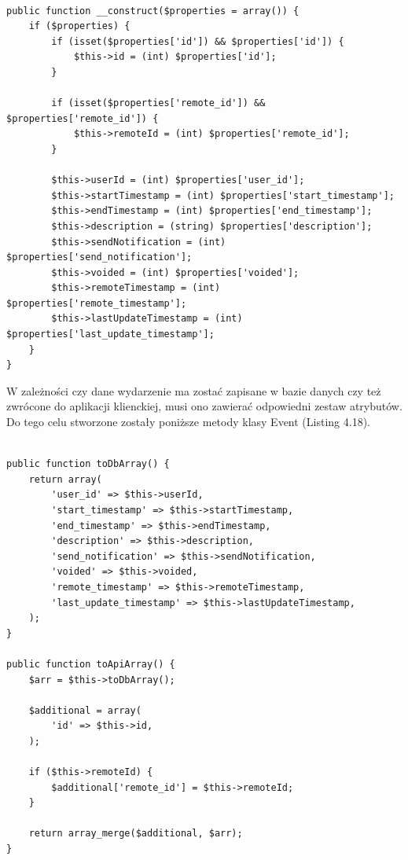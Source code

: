

\begin{lstlisting}[caption=Fragment konstruktora klasy Event., label=amb, captionpos=b]

public function __construct($properties = array()) {
    if ($properties) {
        if (isset($properties['id']) && $properties['id']) {
            $this->id = (int) $properties['id'];
        }

        if (isset($properties['remote_id']) && $properties['remote_id']) {
            $this->remoteId = (int) $properties['remote_id'];
        }

        $this->userId = (int) $properties['user_id'];
        $this->startTimestamp = (int) $properties['start_timestamp'];
        $this->endTimestamp = (int) $properties['end_timestamp'];
        $this->description = (string) $properties['description'];
        $this->sendNotification = (int) $properties['send_notification'];
        $this->voided = (int) $properties['voided'];
        $this->remoteTimestamp = (int) $properties['remote_timestamp'];
        $this->lastUpdateTimestamp = (int) $properties['last_update_timestamp'];
    }
}

\end{lstlisting}

W zależności czy dane wydarzenie ma zostać zapisane w bazie danych czy też zwrócone do aplikacji klienckiej, musi ono zawierać odpowiedni zestaw atrybutów. Do tego celu stworzone zostały poniższe metody klasy Event (Listing 4.18).

\begin{lstlisting}[caption=Serializacja obiektu Event., label=amb, captionpos=b]

public function toDbArray() {
    return array(
        'user_id' => $this->userId,
        'start_timestamp' => $this->startTimestamp,
        'end_timestamp' => $this->endTimestamp,
        'description' => $this->description,
        'send_notification' => $this->sendNotification,
        'voided' => $this->voided,
        'remote_timestamp' => $this->remoteTimestamp,
        'last_update_timestamp' => $this->lastUpdateTimestamp,
    );
}

public function toApiArray() {
    $arr = $this->toDbArray();

    $additional = array(
    	'id' => $this->id,
    );

    if ($this->remoteId) {
    	$additional['remote_id'] = $this->remoteId;
    }

    return array_merge($additional, $arr);
}

\end{lstlisting}

